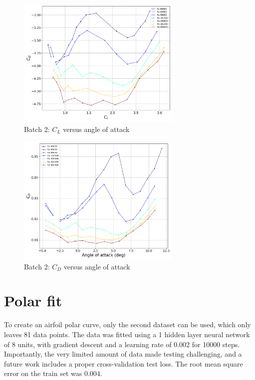\documentclass[letterpaper,12pt]{article}
\begin{document}
\begin{enumerate}
\begin{figure}[H]
    \centering
    \includegraphics[width=0.7\textwidth]{dataCd_Cl}
    \caption{Batch 2: $C_L$ versus angle of attack}%
    \label{fig:cdcl}%
\end{figure}

\begin{figure}[H]
    \centering
    \includegraphics[width=0.7\textwidth]{dataCd}
    \caption{Batch 2: $C_D$ versus angle of attack}%
    \label{fig:cd}%
\end{figure}

\section{Polar fit}

To create an airfoil polar curve, only the second dataset can be used, which only leaves 81 data points. 
The data was fitted using a 1 hidden layer neural network of 8 units, 
with gradient descent and a learning rate of 0.002 for 10000 steps.
Importantly, the very limited amount of data made testing challenging, and a future work includes a proper cross-validation test loss.
The root mean square error on the train set was $0.004$.
\vspace{-1cm}


\end{enumerate}
\end{document}
